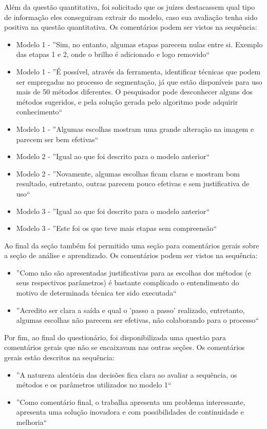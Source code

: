\documentclass[12pt,oneside,a4paper,english,french,spanish,brazil,]{abntex2}
\begin{document}
Além da questão quantitativa, foi solicitado que os juízes destacassem qual tipo de informação eles conseguiram extrair do modelo, caso sua avaliação tenha sido positiva na questão quantitativa. Os comentários podem ser vistos na sequência:
\begin{itemize}
    \item Modelo 1 - ''Sim, no entanto, algumas etapas parecem nulas entre si. Exemplo das etapas 1 e 2, onde o brilho é adicionado e logo removido``
    \item Modelo 1 - ''É possível, através da ferramenta, identificar técnicas que podem ser empregadas no processo de segmentação, já que estão disponíveis para uso mais de 50 métodos diferentes. O pesquisador pode desconhecer alguns dos métodos sugeridos, e pela solução gerada pelo algoritmo pode adquirir conhecimento``
    \item Modelo 1 - ''Algumas escolhas mostram uma grande alteração na imagem e parecem ser bem efetivas``
    \item Modelo 2 - ''Igual ao que foi descrito para o modelo anterior``
    \item Modelo 2 - ''Novamente, algumas escolhas ficam claras e mostram bom resultado, entretanto, outras parecem pouco efetivas e sem justificativa de uso``
    \item Modelo 3 - ''Igual ao que foi descrito para o modelo anterior``
    \item Modelo 3 - ''Este foi os que teve mais etapas sem compreensão``
\end{itemize}
	
Ao final da seção também foi permitido uma seção para comentários gerais sobre a seção de análise e aprendizado. Os comentários podem ser vistos na sequência:
\begin{itemize}
    \item ''Como não são apresentadas justificativas para as escolhas dos métodos (e seus respectivos parâmetros) é bastante complicado o entendimento do motivo de determinada técnica ter sido executada``
    \item ''Acredito ser clara a saída e qual o 'passo a passo' realizado, entretanto, algumas escolhas não parecem ser efetivas, não colaborando para o processo``
\end{itemize}

Por fim, ao final do questionário, foi disponibilizada uma questão para comentários gerais que não se encaixavam nas outras seções. Os comentários gerais estão descritos na sequência:
\begin{itemize}
    \item ''A natureza aleatória das decisões fica clara ao avaliar a sequência, os métodos e os parâmetros utilizados no modelo 1``
    \item ''Como comentário final, o trabalha apresenta um problema interessante, apresenta uma solução inovadora e com possibilidades de continuidade e melhoria``
\end{itemize}
\end{document}
